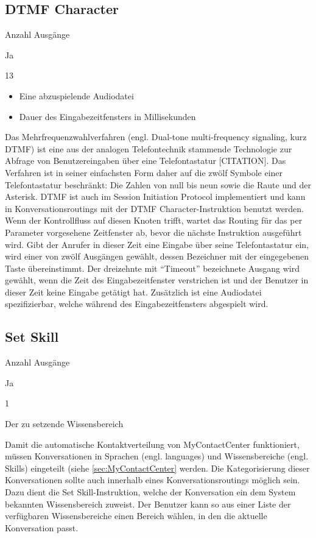 \subsection{DTMF Character}
\begin{labeling}{Anzahl Ausgänge}
\item [Eingang] Ja
\item [Anzahl Ausgänge] 13
\item [Parameter] \begin{itemize} \item Eine abzuspielende Audiodatei  \item Dauer des Eingabezeitfensters in Millisekunden \end{itemize}
\item [Beschreibung] Das Mehrfrequenzwahlverfahren (engl. Dual-tone multi-frequency signaling, kurz DTMF) ist eine aus der analogen Telefontechnik stammende Technologie zur Abfrage von Benutzereingaben über eine Telefontastatur [CITATION]. Das Verfahren ist in seiner einfachsten Form daher auf die zwölf Symbole einer Telefontastatur beschränkt: Die Zahlen von null bis neun sowie die Raute und der Asterisk. DTMF ist auch im Session Initiation Protocol implementiert und kann in Konversationsroutings mit der DTMF Character-Instruktion benutzt werden. Wenn der Kontrollfluss auf diesen Knoten trifft, wartet das Routing für das per Parameter vorgesehene Zeitfenster ab, bevor die nächste Instruktion ausgeführt wird. Gibt der Anrufer in dieser Zeit eine Eingabe über seine Telefontastatur ein, wird einer von zwölf Ausgängen gewählt, dessen Bezeichner mit der eingegebenen Taste übereinstimmt. Der dreizehnte mit ``Timeout'' bezeichnete Ausgang wird gewählt, wenn die Zeit des Eingabezeitfenster verstrichen ist und der Benutzer in dieser Zeit keine Eingabe getätigt hat. Zusätzlich ist eine Audiodatei spezifizierbar, welche während des Eingabezeitfensters abgespielt wird.  
\end{labeling}

\subsection{Set Skill}
\label{subsec:Set Skill}
\begin{labeling}{Anzahl Ausgänge}
\item [Eingang] Ja
\item [Anzahl Ausgänge] 1
\item [Parameter] Der zu setzende Wissensbereich
\item [Beschreibung] Damit die automatische Kontaktverteilung von MyContactCenter funktioniert, müssen Konversationen in Sprachen (engl. languages) und Wissensbereiche (engl. Skills) eingeteilt (siehe \ref{sec:MyContactCenter} werden. Die Kategorisierung dieser Konversationen sollte auch innerhalb eines Konversationsroutings möglich sein. Dazu dient die Set Skill-Instruktion, welche der Konversation ein dem System bekannten Wissensbereich zuweist. Der Benutzer kann so aus einer Liste der verfügbaren Wissensbereiche einen Bereich wählen, in den die aktuelle Konversation passt.
\end{labeling}

